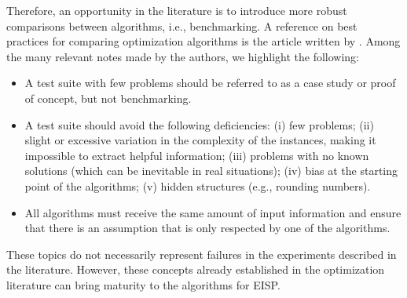 		Therefore, an opportunity in the literature is to introduce more robust comparisons between algorithms, i.e., benchmarking. A reference on best practices for comparing optimization algorithms is the article written by \cite{beiranvand2017best}. Among the many relevant notes made by the authors, we highlight the following:

		\begin{itemize}
			\item A test suite with few problems should be referred to as a case study or proof of concept, but not benchmarking.
			\item A test suite should avoid the following deficiencies: (i) few problems; (ii) slight or excessive variation in the complexity of the instances, making it impossible to extract helpful information; (iii) problems with no known solutions (which can be inevitable in real situations); (iv) bias at the starting point of the algorithms; (v) hidden structures (e.g., rounding numbers).
			\item All algorithms must receive the same amount of input information and ensure that there is an assumption that is only respected by one of the algorithms.
		\end{itemize}
	
		These topics do not necessarily represent failures in the experiments described in the literature. However, these concepts already established in the optimization literature can bring maturity to the algorithms for EISP.

